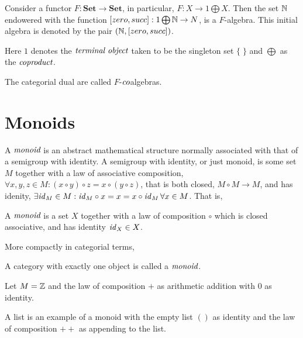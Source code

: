 \documentclass[10pt, oneside, reqno]{amsart}
\begin{document}
\begin{exmp}
 Consider a functor $F: \textbf{Set} \to \textbf{Set}$, in particular, $F: X \to 1 \bigoplus X$.
 Then the set $\mathbb{N}$ endowered with the function $[zero,succ]: 1 \bigoplus \mathbb{N} \to N$, is a $F$-algebra.
 This initial algebra is denoted by the pair $(\mathbb{N}, [zero,succ])$.
\end{exmp}

Here $1$ denotes the $\emph{terminal object}$ taken to be the singleton set $\{ \; \}$
and $\bigoplus$ as the $\emph{coproduct}$.

\begin{rem}
 The categorial dual are called $F$-$\emph{co}$algebras.
\end{rem}


\section{Monoids} %
\label{sec:monoids}
A $\emph{monoid}$ is an abstract mathematical structure normally associated with that of a semigroup with identity.
A semigroup with identity, or just monoid, is some set $M$ together with a law of associative composition,
$\forall x,y,z \in M : (x \circ y) \circ z = x \circ (y \circ z)$, that is both closed, $M \circ M \to M$,
and has idenity, $\exists \mathit{id}_{M} \in M : \mathit{id}_{M} \circ x = x = x \circ \mathit{id}_{M} \, \forall x \in M$. That is,

\begin{defn}
 A $\emph{monoid}$ is a set $X$ together with a law of composition $\circ$
 which is closed associative, and has identity $\mathit{id}_{X} \in X$.
\end{defn}

More compactly in categorial terms,
\begin{defn}[Monoid]
 A category with exactly one object is called a $\emph{monoid}$.
\end{defn}

\begin{exmp}
 Let $M = \mathbb{Z}$ and the law of composition $+$ as arithmetic addition with $0$ as identity.
\end{exmp}

\begin{exmp}
 A list is an example of a monoid with the empty list $()$ as identity and the law of composition $++$ as appending to the list.
\end{exmp}


\end{document}
